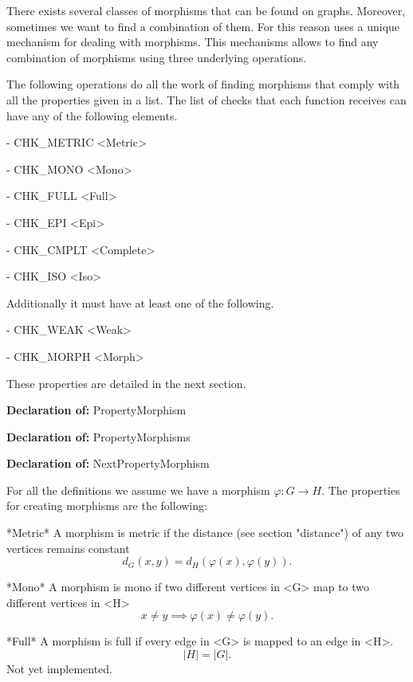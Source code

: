 
There exists several classes of morphisms that can be found on
graphs. Moreover, sometimes we want to find a combination of them. For
this reason {\YAGS} uses a unique mechanism for dealing with
morphisms. This mechanisms allows to find any combination of morphisms
using three underlying operations.


The following operations do all the work of finding morphisms that
comply with all the properties given in a list. The list of checks
that each function receives can have any of the following elements. 
\beginlist
\item{-}
    CHK_METRIC <Metric>
\item{-}
    CHK_MONO <Mono>
\item{-}
    CHK_FULL <Full>
\item{-}
    CHK_EPI <Epi>
\item{-}
    CHK_CMPLT <Complete>
\item{-}
    CHK_ISO <Iso>
\endlist

Additionally it must have at least one of the following.
\beginlist
\item{-}
    CHK_WEAK <Weak>
\item{-}
    CHK_MORPH <Morph>
\endlist

These properties are detailed in the next section.

{\bf Declaration of:  }{PropertyMorphism}

{\bf Declaration of:  }{PropertyMorphisms}

{\bf Declaration of:  }{NextPropertyMorphism}


For all the definitions we assume we have a morphism $\varphi:G
\rightarrow H.$ The properties for creating morphisms are the following:

\beginlist
\item{*Metric*}
A morphism is metric if the distance (see section "distance") of any
two vertices remains constant $$d_G(x,y) = d_H(\varphi(x),\varphi(y)).$$

\item{*Mono*}
A morphism is mono if two different vertices in <G> map to two
different vertices in <H> $$x \neq y \implies \varphi(x) \neq
\varphi(y).$$

\item{*Full*}
A morphism is full if every edge in <G> is mapped to an edge in
<H>. $$|H| = |G|.$$ Not yet implemented.

